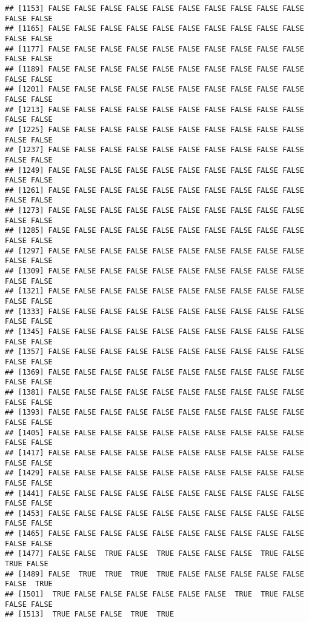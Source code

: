 \documentclass[
]{article}
\newenvironment{Shaded}{\begin{snugshade}}{\end{snugshade}}
\newcommand{\FunctionTok}[1]{\textcolor[rgb]{0.13,0.29,0.53}{\textbf{#1}}}
\newcommand{\NormalTok}[1]{#1}
\newcommand{\SpecialCharTok}[1]{\textcolor[rgb]{0.81,0.36,0.00}{\textbf{#1}}}
\begin{document}
\begin{verbatim}
## [1153] FALSE FALSE FALSE FALSE FALSE FALSE FALSE FALSE FALSE FALSE FALSE FALSE
## [1165] FALSE FALSE FALSE FALSE FALSE FALSE FALSE FALSE FALSE FALSE FALSE FALSE
## [1177] FALSE FALSE FALSE FALSE FALSE FALSE FALSE FALSE FALSE FALSE FALSE FALSE
## [1189] FALSE FALSE FALSE FALSE FALSE FALSE FALSE FALSE FALSE FALSE FALSE FALSE
## [1201] FALSE FALSE FALSE FALSE FALSE FALSE FALSE FALSE FALSE FALSE FALSE FALSE
## [1213] FALSE FALSE FALSE FALSE FALSE FALSE FALSE FALSE FALSE FALSE FALSE FALSE
## [1225] FALSE FALSE FALSE FALSE FALSE FALSE FALSE FALSE FALSE FALSE FALSE FALSE
## [1237] FALSE FALSE FALSE FALSE FALSE FALSE FALSE FALSE FALSE FALSE FALSE FALSE
## [1249] FALSE FALSE FALSE FALSE FALSE FALSE FALSE FALSE FALSE FALSE FALSE FALSE
## [1261] FALSE FALSE FALSE FALSE FALSE FALSE FALSE FALSE FALSE FALSE FALSE FALSE
## [1273] FALSE FALSE FALSE FALSE FALSE FALSE FALSE FALSE FALSE FALSE FALSE FALSE
## [1285] FALSE FALSE FALSE FALSE FALSE FALSE FALSE FALSE FALSE FALSE FALSE FALSE
## [1297] FALSE FALSE FALSE FALSE FALSE FALSE FALSE FALSE FALSE FALSE FALSE FALSE
## [1309] FALSE FALSE FALSE FALSE FALSE FALSE FALSE FALSE FALSE FALSE FALSE FALSE
## [1321] FALSE FALSE FALSE FALSE FALSE FALSE FALSE FALSE FALSE FALSE FALSE FALSE
## [1333] FALSE FALSE FALSE FALSE FALSE FALSE FALSE FALSE FALSE FALSE FALSE FALSE
## [1345] FALSE FALSE FALSE FALSE FALSE FALSE FALSE FALSE FALSE FALSE FALSE FALSE
## [1357] FALSE FALSE FALSE FALSE FALSE FALSE FALSE FALSE FALSE FALSE FALSE FALSE
## [1369] FALSE FALSE FALSE FALSE FALSE FALSE FALSE FALSE FALSE FALSE FALSE FALSE
## [1381] FALSE FALSE FALSE FALSE FALSE FALSE FALSE FALSE FALSE FALSE FALSE FALSE
## [1393] FALSE FALSE FALSE FALSE FALSE FALSE FALSE FALSE FALSE FALSE FALSE FALSE
## [1405] FALSE FALSE FALSE FALSE FALSE FALSE FALSE FALSE FALSE FALSE FALSE FALSE
## [1417] FALSE FALSE FALSE FALSE FALSE FALSE FALSE FALSE FALSE FALSE FALSE FALSE
## [1429] FALSE FALSE FALSE FALSE FALSE FALSE FALSE FALSE FALSE FALSE FALSE FALSE
## [1441] FALSE FALSE FALSE FALSE FALSE FALSE FALSE FALSE FALSE FALSE FALSE FALSE
## [1453] FALSE FALSE FALSE FALSE FALSE FALSE FALSE FALSE FALSE FALSE FALSE FALSE
## [1465] FALSE FALSE FALSE FALSE FALSE FALSE FALSE FALSE FALSE FALSE FALSE FALSE
## [1477] FALSE FALSE  TRUE FALSE  TRUE FALSE FALSE FALSE  TRUE FALSE  TRUE FALSE
## [1489] FALSE  TRUE  TRUE  TRUE  TRUE FALSE FALSE FALSE FALSE FALSE FALSE  TRUE
## [1501]  TRUE FALSE FALSE FALSE FALSE FALSE FALSE  TRUE  TRUE FALSE FALSE FALSE
## [1513]  TRUE FALSE FALSE  TRUE  TRUE
\end{verbatim}

\begin{Shaded}
\end{Shaded}
\end{document}
